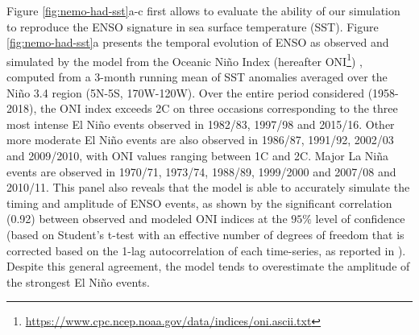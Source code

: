  Figure \ref{fig:nemo-had-sst}a-c first allows to evaluate the ability of our simulation to reproduce the ENSO signature in sea surface temperature (SST). Figure \ref{fig:nemo-had-sst}a presents the temporal evolution of ENSO as observed and simulated by the model from the Oceanic Niño Index (hereafter ONI\footnote{\url{https://www.cpc.ncep.noaa.gov/data/indices/oni.ascii.txt}}) , computed from a 3-month running mean of SST anomalies averaged over the Niño 3.4 region (5N-5S, 170W-120W). Over the entire period considered (1958-2018), the ONI index exceeds 2\degree{}C on three occasions corresponding to the three most intense El Niño events observed in 1982/83, 1997/98 and 2015/16. Other more moderate El Niño events are also observed in 1986/87, 1991/92, 2002/03 and 2009/2010, with ONI values ranging between 1\degree{}C and 2\degree{}C. Major La Niña events are observed in 1970/71, 1973/74, 1988/89, 1999/2000 and 2007/08 and 2010/11. This panel also reveals that the model is able to accurately simulate the timing and amplitude of ENSO events, as shown by the significant correlation (0.92) between observed and modeled ONI indices at the $95\%$ level of confidence (based on Student's t-test with an effective number of degrees of freedom that is corrected based on the 1-lag autocorrelation of each time-series, as reported in \citealp{brethertonEffectiveNumberSpatial1999}). Despite this general agreement, the model tends to overestimate the amplitude of the strongest El Niño events. 

